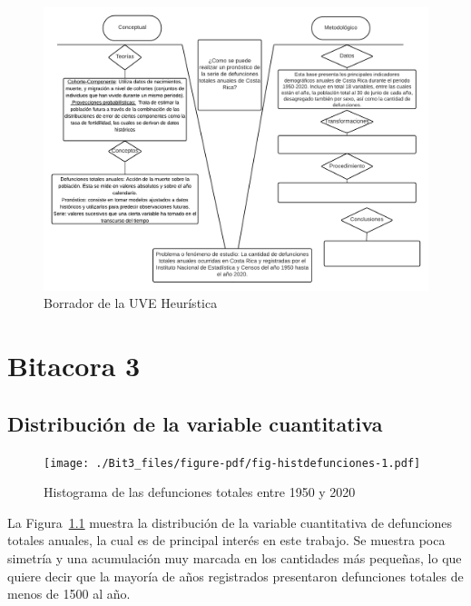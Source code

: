 \documentclass[
  letterpaper,
  onepage,
  openany]{report}
\begin{document}
\begin{figure}[H]

{\centering \includegraphics[width=6.25in,height=\textheight]{./Images/UVE Flecha.png}

}

\caption{Borrador de la UVE Heurística}

\end{figure}


\hypertarget{bitacora-3}{%
\chapter{Bitacora 3}\label{bitacora-3}}

\hypertarget{distribuciuxf3n-de-la-variable-cuantitativa}{%
\section{Distribución de la variable
cuantitativa}\label{distribuciuxf3n-de-la-variable-cuantitativa}}

\begin{figure}[H]

{\centering \texttt{[image: ./Bit3\_files/figure-pdf/fig-histdefunciones-1.pdf]}

}

\caption{\label{fig-histdefunciones}Histograma de las defunciones
totales entre 1950 y 2020}

\end{figure}

La Figura~\ref{fig-histdefunciones} muestra la distribución de la
variable cuantitativa de defunciones totales anuales, la cual es de
principal interés en este trabajo. Se muestra poca simetría y una
acumulación muy marcada en los cantidades más pequeñas, lo que quiere
decir que la mayoría de años registrados presentaron defunciones totales
de menos de 1500 al año.
\end{document}
